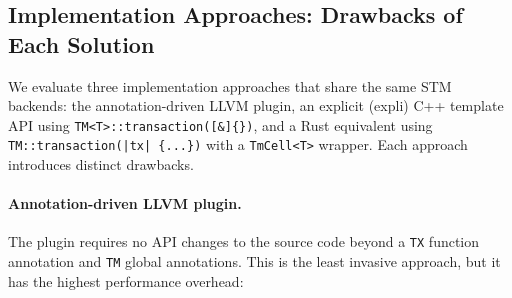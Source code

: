 \documentclass[article,12pt]{article}
\begin{document}
\subsection{Implementation Approaches: Drawbacks of Each Solution}

We evaluate three implementation approaches that share the same STM backends:
the annotation-driven LLVM plugin, an explicit (expli) C++ template API using
\texttt{TM<T>::transaction([\&]\{\})}, and a Rust equivalent using
\texttt{TM::transaction(|tx| \{...\})} with a \texttt{TmCell<T>} wrapper.
Each approach introduces distinct drawbacks.

\paragraph{Annotation-driven LLVM plugin.}
The plugin requires no API changes to the source code beyond a \texttt{TX}
function annotation and \texttt{TM} global annotations.  This is the least
invasive approach, but it has the highest performance overhead:
\end{document}
